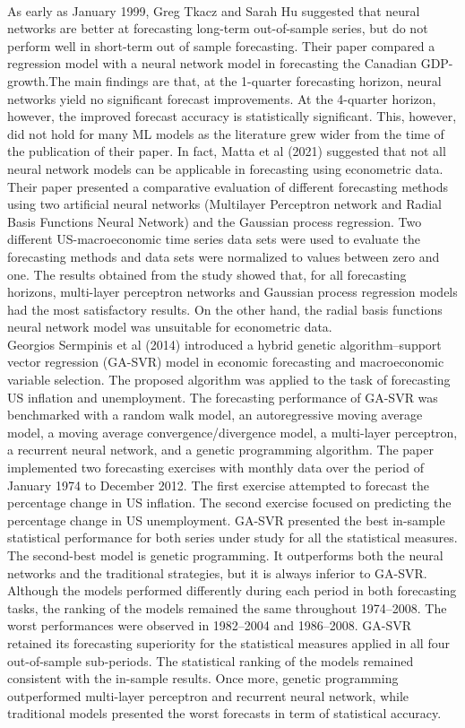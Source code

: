\documentclass[12pt,italian, twoside]{report}
\begin{document}
\\
As early as January 1999, Greg Tkacz and Sarah Hu suggested that neural networks are better at forecasting long-term out-of-sample series, but do not perform well in short-term out of sample forecasting. Their paper compared a regression model with a neural network model in forecasting the Canadian GDP-growth.The main findings are that, at the 1-quarter forecasting horizon, neural networks yield no significant forecast improvements. At the 4-quarter horizon, however, the improved forecast accuracy is statistically significant. This, however, did not hold for many ML models as the literature grew wider from the time of the publication of their paper.
In fact, Matta et al (2021) suggested that not all neural network models can be applicable in forecasting using econometric data. Their paper presented a comparative evaluation of different forecasting methods using two artificial neural networks (Multilayer Perceptron network and Radial Basis Functions Neural Network) and the Gaussian process regression. Two different US-macroeconomic time series data sets were used to evaluate the forecasting methods and data sets were normalized to values between zero and one. The results obtained from the study showed that, for all forecasting horizons, multi-layer perceptron networks and Gaussian process regression models had the most satisfactory results. On the other hand, the radial basis functions neural network model was unsuitable for econometric data.\\
Georgios Sermpinis et al (2014) introduced a hybrid genetic algorithm–support vector regression (GA-SVR) model in economic forecasting and macroeconomic variable selection. The proposed algorithm was applied to the task of forecasting US inflation and unemployment. The forecasting performance of GA-SVR was benchmarked with a random walk model, an autoregressive moving average model, a moving average convergence/divergence model, a multi-layer perceptron, a recurrent neural network, and a genetic programming algorithm. The paper implemented two forecasting exercises with monthly data over the period of January 1974 to December 2012. The first exercise attempted to forecast the percentage change in US inflation. The second exercise focused on predicting the percentage change in US unemployment. GA-SVR presented the best in-sample statistical performance for both series under study for all the statistical measures. The second-best model is genetic programming. It outperforms both the neural networks and the traditional strategies, but it is always inferior to GA-SVR. Although the models performed differently during each period in both forecasting tasks, the ranking of the models remained the same throughout 1974–2008. The worst performances were observed in 1982–2004 and 1986–2008.  GA-SVR retained its forecasting superiority for the statistical measures applied in all four out-of-sample sub-periods. The statistical ranking of the models remained consistent with the in-sample results. Once more, genetic programming outperformed multi-layer perceptron and recurrent neural network, while traditional models presented the worst forecasts in term of statistical accuracy.\\
\end{document}
